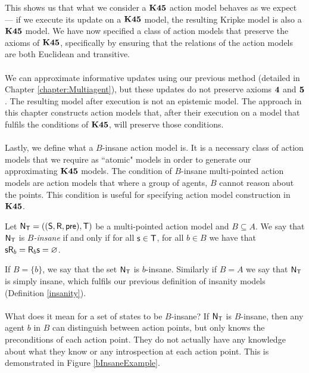 This shows us that what we consider a $\bf K45$ action model behaves as we expect --- if we execute
its update on a $\bf K45$ model, the resulting Kripke model is also a $\bf K45$ model.
We have now specified a class of action models that preserve the axioms of $\bf K45$, specifically by
ensuring that the relations of the action models are both Euclidean and transitive.\\
\\
We can approximate informative updates using our previous method (detailed in Chapter
\ref{chapter:Multiagent}), but these updates do not preserve
axioms $\bf 4$ and $\bf 5$.
The resulting model after execution is not an epistemic model.
The approach in this chapter constructs action models that, after their execution on a model that
fulfils the conditions of $\bf K45$, will preserve those conditions.\\
\\
Lastly, we define what a $B$-insane action model is.
It is a necessary class of action models that we require as ``atomic" models in order to generate our approximating $\bf K45$ models.
The condition of $B$-insane multi-pointed action models are action models that where a group of agents, $B$ cannot
reason about the points.
This condition is useful for specifying action model construction in $\bf K45$.

\begin{defn} \label{binsane}
	Let $\mathrm{\mathsf{N}}_\mathrm{\mathsf{T}} = ((\mathrm{\mathsf{S}}, \mathrm{\mathsf{R}}, \mathrm{\mathsf{pre}}), \mathrm{\mathsf{T}})$ be a multi-pointed action model and $B \subseteq A$.
	We say that $\mathrm{\mathsf{N}}_\mathrm{\mathsf{T}}$ is {\em $B$-insane} if and only if for all $\mathrm{\mathsf{s}} \in \mathrm{\mathsf{T}}$,
	for all $b \in B$ we have that $\mathrm{\mathsf{s}} \mathrm{\mathsf{R}}_b = \mathrm{\mathsf{R}}_b \mathrm{\mathsf{s}} = \varnothing$.
\end{defn}

If $B = \{b\}$, we say that the set $\mathrm{\mathsf{N}}_\mathrm{\mathsf{T}}$ is $b$-insane.
Similarly if $B = A$ we say that $\mathrm{\mathsf{N}}_\mathrm{\mathsf{T}}$ is simply insane, which fulfils
our previous definition of insanity models (Definition \ref{insanity}).\\
\\
What does it mean for a set of states to be $B$-insane?
If $\mathrm{\mathsf{N}}_\mathrm{\mathsf{T}}$ is $B$-insane, then any agent $b$ in $B$ can distinguish between
action points, but only knows the preconditions of each action point.
They do not actually have any knowledge about what they know or any
introspection at each action point.
This is demonstrated in Figure \ref{bInsaneExample}.


